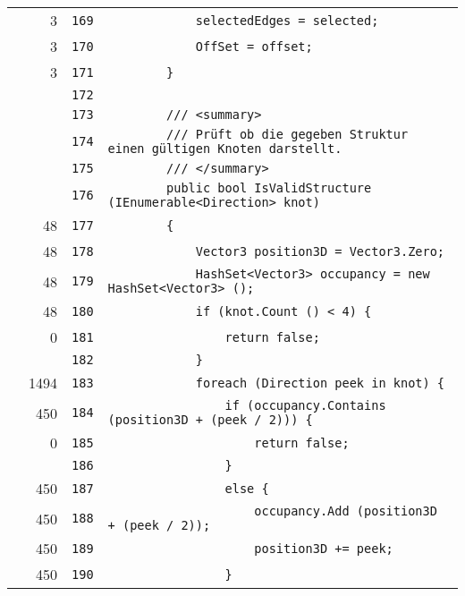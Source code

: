\documentclass[a4paper,10pt]{article}
\begin{document}
\begin{longtable}[l]{lrrl}
\cellcolor{green} & 3 & \verb~169~ & \verb~            selectedEdges = selected;~\\
\cellcolor{green} & 3 & \verb~170~ & \verb~            OffSet = offset;~\\
\cellcolor{green} & 3 & \verb~171~ & \verb~        }~\\
\cellcolor{gray} &  & \verb~172~ & \verb~~\\
\cellcolor{gray} &  & \verb~173~ & \verb~        /// <summary>~\\
\cellcolor{gray} &  & \verb~174~ & \verb~        /// Prüft ob die gegeben Struktur einen gültigen Knoten darstellt.~\\
\cellcolor{gray} &  & \verb~175~ & \verb~        /// </summary>~\\
\cellcolor{gray} &  & \verb~176~ & \verb~        public bool IsValidStructure (IEnumerable<Direction> knot)~\\
\cellcolor{green} & 48 & \verb~177~ & \verb~        {~\\
\cellcolor{green} & 48 & \verb~178~ & \verb~            Vector3 position3D = Vector3.Zero;~\\
\cellcolor{green} & 48 & \verb~179~ & \verb~            HashSet<Vector3> occupancy = new HashSet<Vector3> ();~\\
\cellcolor{green} & 48 & \verb~180~ & \verb~            if (knot.Count () < 4) {~\\
\cellcolor{red} & 0 & \verb~181~ & \verb~                return false;~\\
\cellcolor{gray} &  & \verb~182~ & \verb~            }~\\
\cellcolor{green} & 1494 & \verb~183~ & \verb~            foreach (Direction peek in knot) {~\\
\cellcolor{green} & 450 & \verb~184~ & \verb~                if (occupancy.Contains (position3D + (peek / 2))) {~\\
\cellcolor{red} & 0 & \verb~185~ & \verb~                    return false;~\\
\cellcolor{gray} &  & \verb~186~ & \verb~                }~\\
\cellcolor{green} & 450 & \verb~187~ & \verb~                else {~\\
\cellcolor{green} & 450 & \verb~188~ & \verb~                    occupancy.Add (position3D + (peek / 2));~\\
\cellcolor{green} & 450 & \verb~189~ & \verb~                    position3D += peek;~\\
\cellcolor{green} & 450 & \verb~190~ & \verb~                }~\\

\end{longtable}
\end{document}
